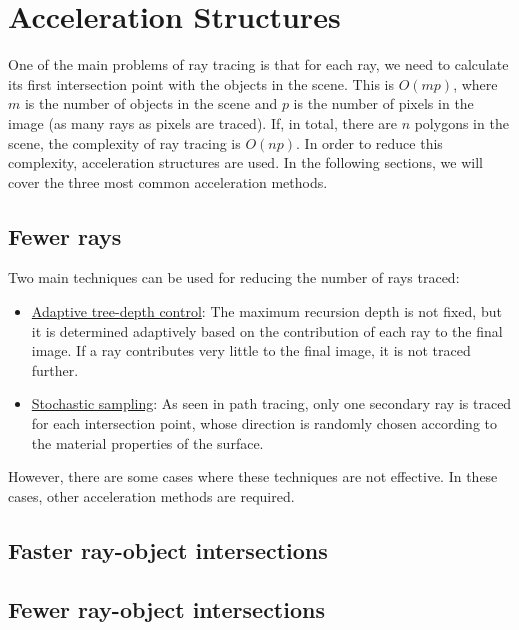 \chapter{Acceleration Structures}

One of the main problems of ray tracing is that for each ray, we need to calculate its first intersection point with the objects in the scene. This is $O(mp)$, where $m$ is the number of objects in the scene and $p$ is the number of pixels in the image (as many rays as pixels are traced). If, in total, there are $n$ polygons in the scene, the complexity of ray tracing is $O(np)$. In order to reduce this complexity, acceleration structures are used. In the following sections, we will cover the three most common acceleration methods.

\section{Fewer rays}

Two main techniques can be used for reducing the number of rays traced:
\begin{itemize}
    \item \ul{Adaptive tree-depth control}: The maximum recursion depth is not fixed, but it is determined adaptively based on the contribution of each ray to the final image. If a ray contributes very little to the final image, it is not traced further.
    \item \ul{Stochastic sampling}: As seen in path tracing, only one secondary ray is traced for each intersection point, whose direction is randomly chosen according to the material properties of the surface.
\end{itemize}

However, there are some cases where these techniques are not effective. In these cases, other acceleration methods are required.


\section{Faster ray-object intersections}


\section{Fewer ray-object intersections}